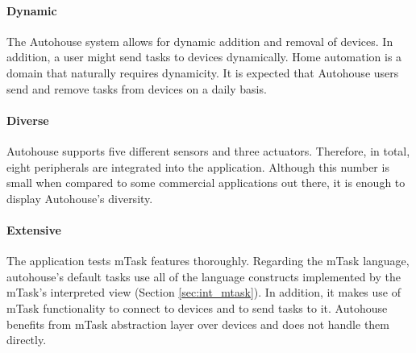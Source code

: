 \paragraph{Dynamic} The Autohouse system allows for dynamic addition and removal of devices. In addition, a user might send tasks to devices dynamically. Home automation is a domain that naturally requires dynamicity. It is expected that Autohouse users send and remove tasks from devices on a daily basis.

\paragraph{Diverse} Autohouse supports five different sensors and three actuators. Therefore, in total, eight peripherals are integrated into the application. Although this number is small when compared to some commercial applications out there, it is enough to display Autohouse's diversity.

\paragraph{Extensive} The application tests \gls{mTask} features thoroughly. Regarding the \gls{mTask} language, \gls{autohouse}'s default tasks use all of the language constructs implemented by the \gls{mTask}'s interpreted view (Section \ref{sec:int_mtask}). In addition, it makes use of \gls{mTask} functionality to connect to devices and to send tasks to it. Autohouse benefits from \gls{mTask} abstraction layer over devices and does not handle them directly.

